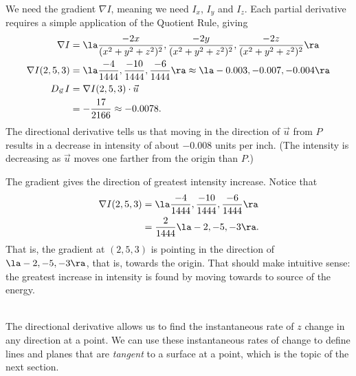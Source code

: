 {We need the gradient $\nabla I$, meaning we need $I_x$, $I_y$ and $I_z$. Each partial derivative requires a simple application of the Quotient Rule, giving
\begin{align*}
\nabla I &= \la \frac{-2x}{(x^2+y^2+z^2)^2},\frac{-2y}{(x^2+y^2+z^2)^2},\frac{-2z}{(x^2+y^2+z^2)^2}\ra\\
\nabla I(2,5,3) &= \la \frac{-4}{1444},\frac{-10}{1444},\frac{-6}{1444}\ra \approx \la -0.003,-0.007,-0.004\ra\\
D_{\vec u\,}I &= \nabla I(2,5,3)\cdot \vec u\\
					&= -\frac{17}{2166} \approx -0.0078.
\end{align*}
The directional derivative tells us that moving in the direction of $\vec u$ from $P$ results in a decrease in intensity of about $-0.008$ units per inch. (The intensity is decreasing as $\vec u$ moves one farther from the origin than $P$.)

The gradient gives the direction of greatest intensity increase. Notice that 
\begin{align*}
\nabla I(2,5,3) &= \la \frac{-4}{1444},\frac{-10}{1444},\frac{-6}{1444}\ra\\
			&= \frac{2}{1444}\la -2,-5,-3\ra.
\end{align*}
That is, the gradient at $(2,5,3)$ is pointing in the direction of $\la -2,-5,-3\ra$, that is, towards the origin. That should make intuitive sense: the greatest increase in intensity is found by moving towards to source of the energy.
}\\

The directional derivative allows us to find the instantaneous rate of $z$ change in any direction at a point. We can use these instantaneous rates of change to define lines and planes that are \emph{tangent} to a surface at a point, which is the topic of the next section.
